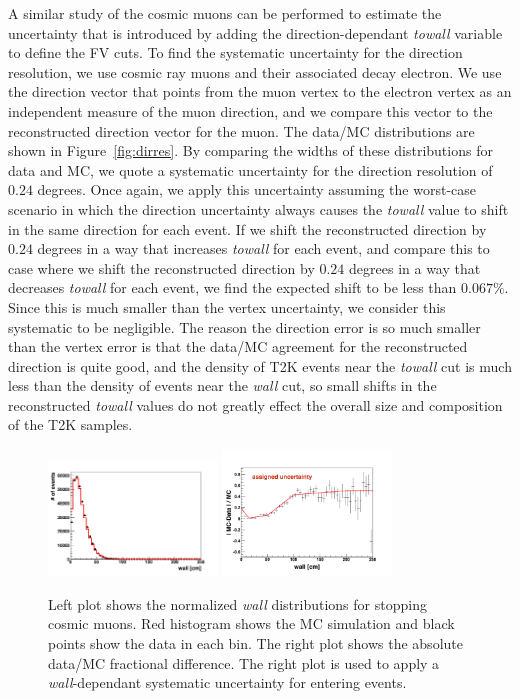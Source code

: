 \documentclass[12pt]{article}
\def\wall{\emph{wall}\xspace}
\def\towall{\emph{towall}\xspace}
\begin{document}
A similar study of the cosmic muons can be performed to estimate the
uncertainty that is introduced by adding the direction-dependant \towall
variable to define the FV cuts.  To find the systematic uncertainty for the
direction resolution, we use cosmic ray muons and their associated decay
electron. We use the direction vector that points from the muon vertex to the
electron vertex as an independent measure of the muon direction, and we compare
this vector to the reconstructed direction vector for the muon.  The data/MC
distributions are shown in Figure~\ref{fig:dirres}.  By comparing the widths of
these distributions for data and MC, we quote a systematic uncertainty for the
direction resolution of $0.24$ degrees.  Once again, we apply this uncertainty
assuming the worst-case scenario in which the direction uncertainty always
causes the \towall value to shift in the same direction for each event.  If we
shift the reconstructed direction by $0.24$ degrees in a way that increases
\towall for each event, and compare this to case where we shift the
reconstructed direction by $0.24$ degrees in a way that decreases \towall for
each event, we find the expected shift to be less than $0.067\%$.  Since this
is much smaller than the vertex uncertainty, we consider this systematic to be
negligible.  The reason the direction error is so much smaller than the vertex
error is that the data/MC agreement for the reconstructed direction is quite
good, and the density of T2K events near the \towall cut is much less than the
density of events near the \wall cut, so small shifts in the reconstructed
\towall values do not greatly effect the overall size and composition of the T2K
samples.

\begin{figure}[h!t]
  \begin{center}
    \includegraphics[width=0.4\textwidth]{cosmic_walldist}
    \includegraphics[width=0.4\textwidth]{entering_wall_unc}
  \end{center}
  \caption{Left plot shows the normalized \wall distributions for stopping cosmic muons.  Red histogram
  shows the MC simulation and black points show the data in each bin.  The right plot shows the absolute 
  data/MC fractional difference.  The right plot is used to apply a \wall-dependant systematic uncertainty
  for entering events.}
  \label{fig:enteringwall}
\end{figure}
\end{document}
